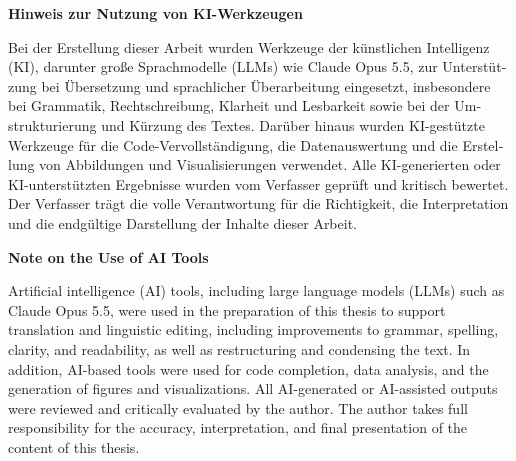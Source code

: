 \vspace{14mm}

{\small
\noindent
\begin{otherlanguage}{ngerman}
\textbf{Hinweis zur Nutzung von KI-Werkzeugen}

\noindent
Bei der Erstellung dieser Arbeit wurden Werkzeuge der künstlichen Intelligenz (KI), darunter große Sprachmodelle (LLMs) wie Claude Opus 5.5, zur Unterstützung bei Übersetzung und sprachlicher Überarbeitung eingesetzt, insbesondere bei Grammatik, Rechtschreibung, Klarheit und Lesbarkeit sowie bei der Umstrukturierung und Kürzung des Textes.
Darüber hinaus wurden KI-gestützte Werkzeuge für die Code-Vervollständigung, die Datenauswertung und die Erstellung von Abbildungen und Visualisierungen verwendet.
Alle KI-generierten oder KI-unterstützten Ergebnisse wurden vom Verfasser geprüft und kritisch bewertet. Der Verfasser trägt die volle Verantwortung für die Richtigkeit, die Interpretation und die endgültige Darstellung der Inhalte dieser Arbeit.
\end{otherlanguage}

\vspace{5mm}

\noindent
\textbf{Note on the Use of AI Tools}

\noindent
Artificial intelligence (AI) tools, including large language models (LLMs) such as Claude Opus 5.5, were used in the preparation of this thesis to support translation and linguistic editing, including improvements to grammar, spelling, clarity, and readability, as well as restructuring and condensing the text.
In addition, AI-based tools were used for code completion, data analysis, and the generation of figures and visualizations.
All AI-generated or AI-assisted outputs were reviewed and critically evaluated by the author. The author takes full responsibility for the accuracy, interpretation, and final presentation of the content of this thesis.
\par}

\cleardoublepage{}

\thispagestyle{empty}
\null
\newpage
